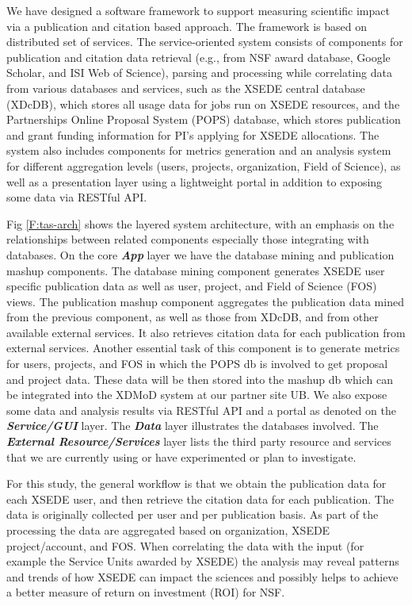 \documentclass{sig-alternate}
\begin{document}
We have designed a software framework to support measuring scientific impact via a publication and citation based approach. The framework is based on distributed set of services. The service-oriented system consists of components for publication and citation data retrieval (e.g., from NSF award database, Google Scholar, and ISI Web of Science), parsing and processing while correlating data from various databases and services, such as the XSEDE central database (XDcDB), which stores all usage data for jobs run on XSEDE resources, and the Partnerships Online Proposal System (POPS) database, which stores publication and grant funding information for PI's applying for XSEDE allocations. The system also includes components for metrics generation and an analysis system for different aggregation levels (users, projects, organization, Field of Science), as well as a presentation layer using a lightweight portal in addition to exposing some data via RESTful API.

Fig \ref{F:tas-arch} shows the layered system architecture, with an emphasis on the relationships between related components especially those integrating with databases. On the core \emph{\textbf{App}} layer we have the database mining and publication mashup components. The database mining component generates XSEDE user specific publication data as well as user, project, and Field of Science (FOS) views. The publication mashup component aggregates the publication data mined from the previous component, as well as those from XDcDB, and from other available external services. It also retrieves citation data for each publication from external services. Another essential task of this component is to generate metrics for users, projects, and FOS in which the POPS db is involved to get proposal and project data. These data will be then stored into the mashup db which can be integrated into the XDMoD \cite{Furlani:2013:UXF:2484762.2484763} system at our partner site UB. We also expose some data and analysis results via RESTful API and a portal as denoted on the \emph{\textbf{Service/GUI}} layer. The \emph{\textbf{Data}} layer illustrates the databases involved. The \emph{\textbf{External Resource/Services}} layer lists the third party resource and services that we are currently using or have experimented or plan to investigate.

For this study, the general workflow is that we obtain the publication data for each XSEDE user, and then retrieve the citation data for each publication. The data is originally collected per user and per publication basis. As part of the processing the data  are aggregated based on organization, XSEDE project/account, and FOS. When correlating the data with the input (for example the Service Units awarded by XSEDE) the analysis may reveal patterns and trends of how XSEDE can impact the sciences and possibly helps to achieve a better measure of return on investment (ROI) for NSF. 
 
\end{document}
